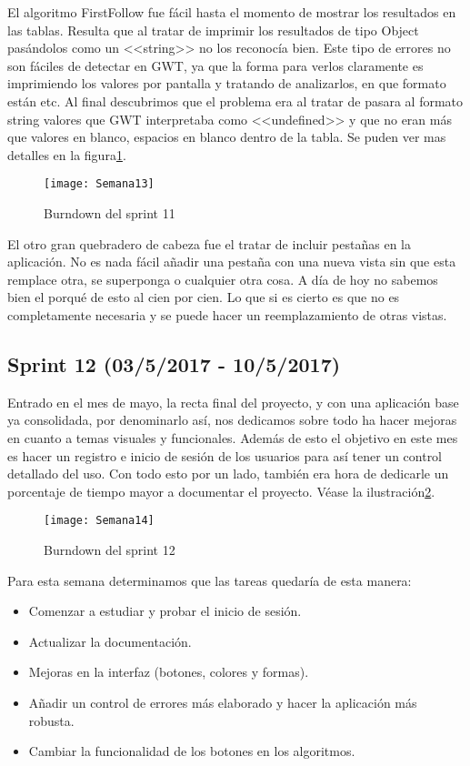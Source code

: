 El algoritmo FirstFollow fue fácil hasta el momento de mostrar los resultados en las tablas. Resulta que al tratar de imprimir los resultados de tipo Object pasándolos como un <<string>> no los reconocía bien. Este tipo de errores no son fáciles de detectar en GWT, ya que la forma para verlos claramente es imprimiendo los valores por pantalla y tratando de analizarlos, en que formato están etc. Al final descubrimos que el problema era al tratar de pasara al formato string valores que GWT interpretaba como <<undefined>> y que no eran más que valores en blanco, espacios en blanco dentro de la tabla. Se puden ver mas detalles en la figura\ref{fig:A.10}.

\begin{figure}[h]
\centering
\texttt{[image: Semana13]}
\caption{Burndown del sprint 11}
\label{fig:A.10}
\end{figure}

El otro gran quebradero de cabeza fue el tratar de incluir pestañas en la aplicación. No es nada fácil añadir una pestaña con una nueva vista sin que esta remplace otra, se superponga o cualquier otra cosa. A día de hoy no sabemos bien el porqué de esto al cien por cien. Lo que si es cierto es que no es completamente necesaria y se puede hacer un reemplazamiento de otras vistas.

\subsection{Sprint 12 (03/5/2017 - 10/5/2017)}

Entrado en el mes de mayo, la recta final del proyecto, y con una aplicación base ya consolidada, por denominarlo así, nos dedicamos sobre todo ha hacer mejoras en cuanto a temas visuales y funcionales. Además de esto el objetivo en este mes es hacer un registro e inicio de sesión de los usuarios para así tener un control detallado del uso.
Con todo esto por un lado, también era hora de dedicarle un porcentaje de tiempo mayor a documentar el proyecto. Véase la ilustración\ref{fig:A.11}.

\begin{figure}[h]
\centering
\texttt{[image: Semana14]}
\caption{Burndown del sprint 12}
\label{fig:A.11}
\end{figure}

Para esta semana determinamos que las tareas quedaría de esta manera:

\begin{itemize}
\item Comenzar a estudiar y probar el inicio de sesión.
\item Actualizar la documentación.
\item Mejoras en la interfaz (botones, colores y formas).
\item Añadir un control de errores más elaborado y hacer la aplicación más robusta.
\item Cambiar la funcionalidad de los botones en los algoritmos.
\end{itemize}


